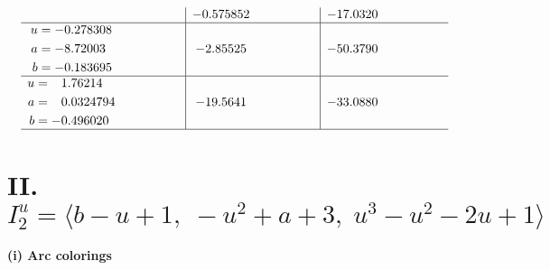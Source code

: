\documentclass[1p]{elsarticle_modified}
\theoremstyle{definition}
\begin{document}
$$\begin{array}{c|c|c}
 & -0.575852\phantom{ +0.000000I} & -17.0320\phantom{ +0.000000I} \\ \hline\begin{aligned}
u &= -0.278308\phantom{ +0.000000I} \\
a &= -8.72003\phantom{ +0.000000I} \\
b &= -0.183695\phantom{ +0.000000I}\end{aligned}
 & -2.85525\phantom{ +0.000000I} & -50.3790\phantom{ +0.000000I} \\ \hline\begin{aligned}
u &= \phantom{-}1.76214\phantom{ +0.000000I} \\
a &= \phantom{-}0.0324794\phantom{ +0.000000I} \\
b &= -0.496020\phantom{ +0.000000I}\end{aligned}
 & -19.5641\phantom{ +0.000000I} & -33.0880\phantom{ +0.000000I}\\
 \hline 
 \end{array}$$\newpage\newpage\renewcommand{\arraystretch}{1}
\centering \section*{II. $I^u_{2}= \langle b- u+1,\;- u^2+a+3,\;u^3- u^2-2 u+1 \rangle$}
\flushleft \textbf{(i) Arc colorings}\\
\end{document}
